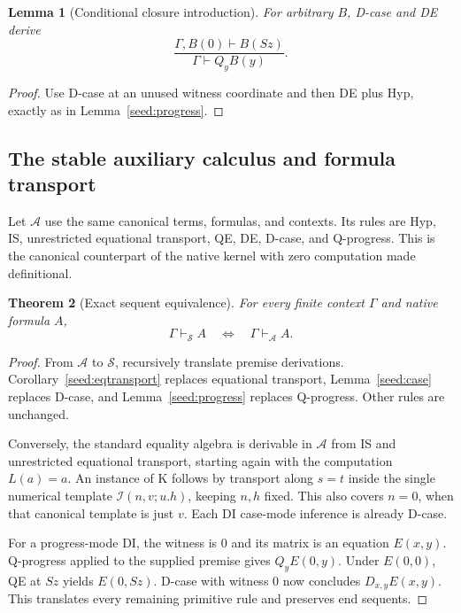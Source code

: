 \documentclass[11pt,a4paper]{article}
\newtheorem{theorem}{Theorem}[section]
\newtheorem{lemma}[theorem]{Lemma}
\theoremstyle{definition}
\begin{document}
\begin{lemma}[Conditional closure introduction]\label{seed:Qcase}
For arbitrary $B$, D-case and DE derive
\[
 \frac{\Gamma,B(0)\vdash B(Sz)}{\Gamma\vdash Q_yB(y)}.
 \tag{Q-case}\label{seed:qcase}
\]
\end{lemma}
\begin{proof}
Use D-case at an unused witness coordinate and then DE plus Hyp,
exactly as in Lemma~\ref{seed:progress}.
\end{proof}

\subsection{The stable auxiliary calculus and formula transport}

Let $\mathcal A$ use the same canonical terms, formulas, and contexts.
Its rules are Hyp, IS, unrestricted equational transport,
QE, DE, D-case, and Q-progress. This is the canonical counterpart of
the native kernel with zero computation made definitional.

\begin{theorem}[Exact sequent equivalence]\label{seed:auxequiv}
For every finite context $\Gamma$ and native formula $A$,
\[
 \Gamma\vdash_{\mathcal S}A
 \quad\Longleftrightarrow\quad
 \Gamma\vdash_{\mathcal A}A.
\]
\end{theorem}
\begin{proof}
From $\mathcal A$ to $\mathcal S$, recursively translate premise
derivations. Corollary~\ref{seed:eqtransport} replaces equational
transport, Lemma~\ref{seed:case} replaces D-case, and
Lemma~\ref{seed:progress} replaces Q-progress. Other rules are unchanged.

Conversely, the standard equality algebra is derivable in
$\mathcal A$ from IS and unrestricted equational transport, starting
again with the computation $L(a)=a$. An instance of K follows by
transport along $s=t$ inside the single numerical template
$\mathcal I(n,v;u.h)$, keeping $n,h$ fixed.
This also covers $n=0$, when that canonical template is just $v$.
Each DI case-mode inference is already D-case.

For a progress-mode DI, the witness is $0$ and its matrix is an equation
$E(x,y)$. Q-progress applied to the supplied premise gives
$Q_yE(0,y)$. Under $E(0,0)$, QE at $Sz$ yields $E(0,Sz)$.
D-case with witness $0$ now concludes $D_{x,y}E(x,y)$.
This translates every remaining primitive rule and preserves end sequents.
\end{proof}
\end{document}
